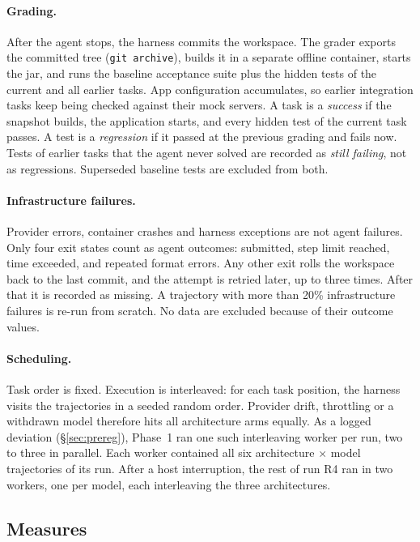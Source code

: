 \documentclass[10pt]{article}
\newcommand{\code}[1]{\texttt{#1}}
\begin{document}
\paragraph{Grading.} After the agent stops, the harness commits the workspace. The grader exports the
committed tree (\code{git archive}), builds it in a separate offline container, starts the jar,
and runs the baseline acceptance suite plus the hidden tests of the current and all earlier tasks.
App configuration accumulates, so earlier integration tasks keep being checked against their mock
servers. A task is a \emph{success} if the snapshot builds, the application starts, and every
hidden test of the current task passes. A test is a \emph{regression} if it passed at the previous
grading and fails now. Tests of earlier tasks that the agent never solved are recorded as
\emph{still failing}, not as regressions. Superseded baseline tests are excluded from both.

\paragraph{Infrastructure failures.} Provider errors, container crashes and harness exceptions are
not agent failures. Only four exit states count as agent outcomes: submitted, step limit reached,
time exceeded, and repeated format errors. Any other exit rolls the workspace back to the last
commit, and the attempt is retried later, up to three times. After that it is recorded as missing.
A trajectory with more than 20\% infrastructure failures is re-run from scratch. No data are
excluded because of their outcome values.

\paragraph{Scheduling.} Task order is fixed. Execution is interleaved: for each task position, the
harness visits the trajectories in a seeded random order. Provider drift, throttling or a withdrawn
model therefore hits all architecture arms equally. As a logged deviation (\S\ref{sec:prereg}),
Phase~1 ran one such interleaving worker per run, two to three in parallel. Each worker contained
all six architecture $\times$ model trajectories of its run. After a host interruption, the rest of
run R4 ran in two workers, one per model, each interleaving the three architectures.

\subsection{Measures}\label{sec:measures}
\end{document}
